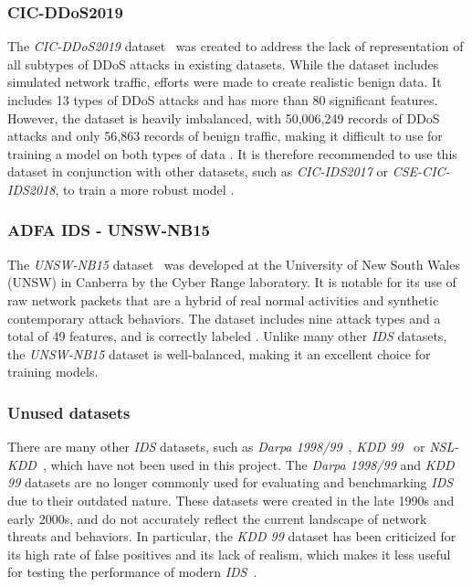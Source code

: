 \subsubsection{CIC-DDoS2019}
The \textit{CIC-DDoS2019} dataset~\cite{CICDDoS2019} was created to address the lack of representation of all subtypes
of DDoS attacks in existing datasets.
While the dataset includes simulated network traffic, efforts were made to create realistic benign data.
It includes 13 types of DDoS attacks and has more than 80 significant features.
However, the dataset is heavily imbalanced, with 50,006,249 records of DDoS attacks and only 56,863 records of benign
traffic, making it difficult to use for training a model on both types of data \cite{RING2019147}.
It is therefore recommended to use this dataset in conjunction with other datasets, such as \textit{CIC-IDS2017} or
\textit{CSE-CIC-IDS2018}, to train a more robust model \cite{Shroff2022}.

\subsubsection{ADFA IDS - UNSW-NB15}
The \textit{UNSW-NB15} dataset~\cite{UNSW-NB15} was developed at the University of New South Wales (UNSW) in Canberra
by the Cyber Range laboratory.
It is notable for its use of raw network packets that are a hybrid of real normal activities and synthetic contemporary
attack behaviors.
The dataset includes nine attack types and a total of 49 features, and is correctly labeled \cite{RING2019147}.
Unlike many other \textit{IDS} datasets, the \textit{UNSW-NB15} dataset is well-balanced, making it an excellent choice
for training models.

\subsubsection{Unused datasets}
There are many other \textit{IDS} datasets, such as \textit{Darpa 1998/99}~\cite{darpa1999},
\textit{KDD 99}~\cite{KDDCUP99} or \textit{NSL-KDD}~\cite{KDDCUP99}, which have not been used in this project.
The \textit{Darpa 1998/99} and \textit{KDD 99} datasets are no longer commonly used for evaluating and benchmarking
\textit{IDS} due to their outdated nature.
These datasets were created in the late 1990s and early 2000s, and do not accurately reflect the current landscape of
network threats and behaviors.
In particular, the \textit{KDD 99} dataset has been criticized for its high rate of false positives and its lack of
realism, which makes it less useful for testing the performance of modern \textit{IDS}~\cite{hugh2000, KDDFaults}.

